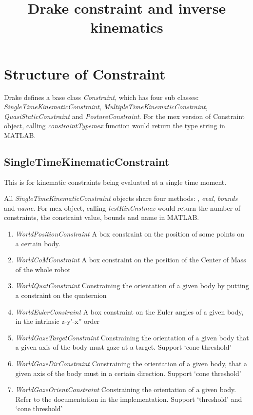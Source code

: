 \documentclass{article}
\title{Drake constraint and inverse kinematics}
\begin{document}
\maketitle
\section{Structure of Constraint}
Drake defines a base class \textsl{Constraint}, which has four sub classes: \textsl{SingleTimeKinematicConstraint}, \textsl{MultipleTimeKinematicConstraint}, \textsl{QuasiStaticConstraint} and \textsl{PostureConstraint}. For the mex version of Constraint object, calling \textsl{constraintTypemex} function would return the type string in MATLAB. 

\subsection{SingleTimeKinematicConstraint}
This is for kinematic constraints being evaluated at a single time moment.

All \textsl{SingleTimeKinematicConstraint} objects share four methods: , \textsl{eval}, \textsl{bounds} and \textsl{name}. For mex object, calling \textsl{testKinCnstmex} would return the number of constraints, the constraint value, bounds and name in MATLAB.
\begin{enumerate}
\item \textsl{WorldPositionConstraint} A box constraint on the position of some points on a certain body.
\item \textsl{WorldCoMConstraint} A box constraint on the position of the Center of Mass of the whole robot
\item \textsl{WorldQuatConstraint} Constraining the orientation of a given body by putting a constraint on the quaternion
\item \textsl{WorldEulerConstraint} A box constraint on the Euler angles of a given body, in the intrinsic z-y'-x'' order
\item \textsl{WorldGazeTargetConstraint} Constraining the orientation of a given body that a given axis of the body must gaze at a target. Support `cone threshold'
\item \textsl{WorldGazeDirConstraint} Constraining the orientation of a given body, that a given axis of the body must in a certain direction. Support `cone threshold'
\item \textsl{WorldGazeOrientConstraint} Constraining the orientation of a given body. Refer to the documentation in the implementation. Support `threshold' and `cone threshold'
\end{enumerate}
\end{document}
